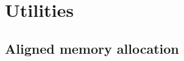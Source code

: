 %
%
%
%

\chapter{Utilities}
\label{chap:Utilities}

\section{Aligned memory allocation}
\label{sec:Aligned memory allocation}

